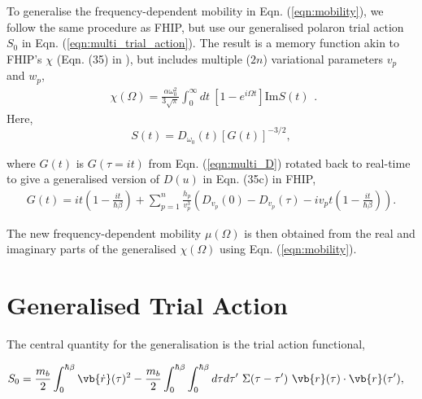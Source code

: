 To generalise the frequency-dependent mobility in Eqn. (\ref{eqn:mobility}), we follow the same procedure as FHIP, but use our generalised polaron trial action $S_0$ in Eqn. (\ref{eqn:multi_trial_action}). The result is a memory function akin to FHIP's $\chi$ (Eqn. (35) in \cite{Feynman1962}), but includes multiple ($2n$) variational parameters $v_{p}$ and $w_{p}$,
\begin{equation}\label{eqn:multichi}
    \begin{gathered}
        \chi(\Omega) = \frac{\alpha \omega_0^{2}}{3\sqrt{\pi}} \int_0^{\infty} dt\ \left[1 - e^{i\Omega t}\right] \textrm{Im} S(t)
    \end{gathered} .
\end{equation}
Here, 
\begin{equation}
    S(t) = D_{\omega_0}(t) [G(t)]^{-3/2} ,
\end{equation}

where $G(t)$ is $G(\tau = i t)$ from Eqn. (\ref{eqn:multi_D}) rotated back to real-time to give a generalised version of $D(u)$ in Eqn. (35c) in FHIP,
\begin{equation}
    \begin{gathered}
         G(t) = i t  \left(1 - \frac{i t}{\hbar\beta}\right) + \sum_{p=1}^n \frac{h_p}{v_p^3} \left(D_{v_p}(0) - D_{v_p}(\tau) - iv_p t\left(1 - \frac{it}{\hbar\beta} \right) \right).
    \end{gathered}
\end{equation}

The new frequency-dependent mobility $\mu(\Omega)$ is then obtained from the real and imaginary parts of the generalised $\chi(\Omega)$ using Eqn. (\ref{eqn:mobility}).

\section{Generalised Trial Action}

The central quantity for the generalisation is the trial action functional,

\begin{equation} \label{eqn:generaltrial}
    \begin{aligned}
        S_0 &= \frac{m_b}{2} \int_0^{\hbar\beta} \vb{\Dot{r}}(\tau)^2 - \frac{m_b}{2} \int_0^{\hbar\beta} \int_0^{\hbar\beta} d\tau d\tau'\ \Sigma(\tau - \tau')\ \vb{r}(\tau) \cdot \vb{r}(\tau'),
    \end{aligned}
\end{equation}

